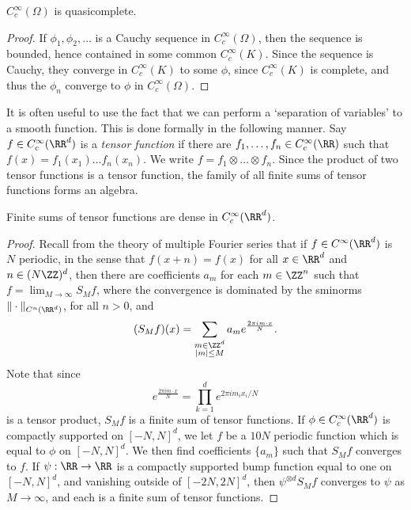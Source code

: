 \begin{corollary}
    $C_c^\infty(\Omega)$ is quasicomplete.
\end{corollary}
\begin{proof}
    If $\phi_1, \phi_2, \dots$ is a Cauchy sequence in $C_c^\infty(\Omega)$, then the sequence is bounded, hence contained in some common $C_c^\infty(K)$. Since the sequence is Cauchy, they converge in $C_c^\infty(K)$ to some $\phi$, since $C_c^\infty(K)$ is complete, and thus the $\phi_n$ converge to $\phi$ in $C_c^\infty(\Omega)$.
\end{proof}

It is often useful to use the fact that we can perform a `separation of variables' to a smooth function. This is done formally in the following manner. Say $f \in C_c^\infty(\RR^d)$ is a {\it tensor function} if there are $f_1, \dots, f_n \in C_c^\infty(\RR)$ such that $f(x) = f_1(x_1) \dots f_n(x_n)$. We write $f = f_1 \otimes \dots \otimes f_n$. Since the product of two tensor functions is a tensor function, the family of all finite sums of tensor functions forms an algebra.

\begin{theorem}
    Finite sums of tensor functions are dense in $C_c^\infty(\RR^d)$.
\end{theorem}
\begin{proof}
    Recall from the theory of multiple Fourier series that if $f \in C^\infty(\RR^d)$ is $N$ periodic, in the sense that $f(x + n) = f(x)$ for all $x \in \RR^d$ and $n \in (N \ZZ)^d$, then there are coefficients $a_m$ for each $m \in \ZZ^n$ such that $f = \lim_{M \to \infty} S_M f$, where the convergence is dominated by the sminorms $\| \cdot \|_{C^n(\RR^d)}$, for all $n > 0$, and
    \[ (S_M f)(x) = \sum_{\substack{m \in \ZZ^d\\|m| \leq M}} a_m e^{\frac{2 \pi i m \cdot x}{N}}. \]
    Note that since
    \[ e^{\frac{2 \pi i m \cdot x}{N}} = \prod_{k = 1}^d e^{2 \pi i m_ix_i/N} \]
    is a tensor product, $S_M f$ is a finite sum of tensor functions. If $\phi \in C_c^\infty(\RR^d)$ is compactly supported on $[-N,N]^d$, we let $f$ be a $10N$ periodic function which is equal to $\phi$ on $[-N,N]^d$. We then find coefficients $\{ a_m \}$ such that $S_M f$ converges to $f$. If $\psi: \RR \to \RR$ is a compactly supported bump function equal to one on $[-N,N]^d$, and vanishing outside of $[-2N,2N]^d$, then $\psi^{\otimes d} S_M f$ converges to $\psi$ as $M \to \infty$, and each is a finite sum of tensor functions.
\end{proof}


